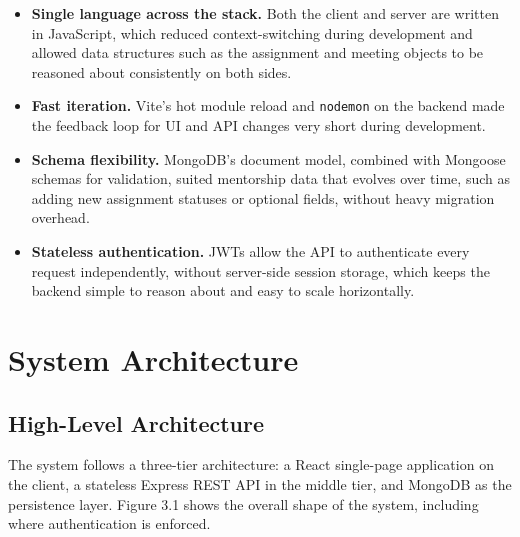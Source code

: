 \documentclass[12pt,a4paper]{report}
\newcommand{\sectionrule}{\vspace{-4pt}{\color{lightgray}\hrule height 1pt}\vspace{8pt}}
\begin{document}
\begin{itemize}[itemsep=2pt]
  \item \textbf{Single language across the stack.} Both the client and server are written in JavaScript, which reduced context-switching during development and allowed data structures such as the assignment and meeting objects to be reasoned about consistently on both sides.
  \item \textbf{Fast iteration.} Vite's hot module reload and \texttt{nodemon} on the backend made the feedback loop for UI and API changes very short during development.
  \item \textbf{Schema flexibility.} MongoDB's document model, combined with Mongoose schemas for validation, suited mentorship data that evolves over time, such as adding new assignment statuses or optional fields, without heavy migration overhead.
  \item \textbf{Stateless authentication.} JWTs allow the API to authenticate every request independently, without server-side session storage, which keeps the backend simple to reason about and easy to scale horizontally.
\end{itemize}

\chapter{System Architecture}

\section{High-Level Architecture}
\sectionrule
The system follows a three-tier architecture: a React single-page application on the client, a stateless Express REST API in the middle tier, and MongoDB as the persistence layer. Figure 3.1 shows the overall shape of the system, including where authentication is enforced.
\end{document}
